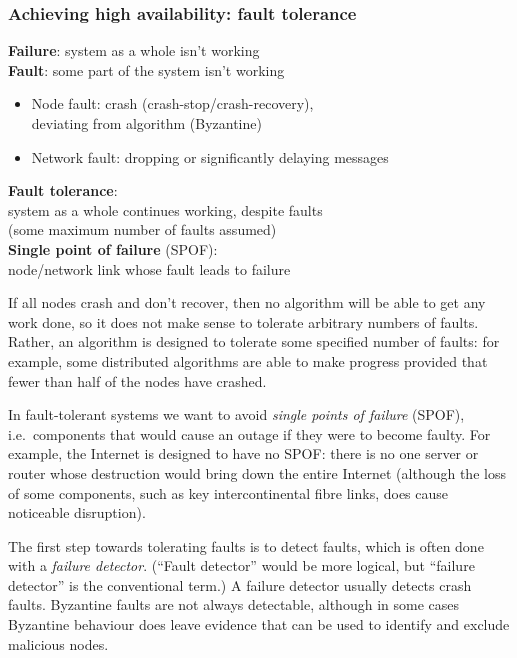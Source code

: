 \begin{frame}
    \label{s:fault-tolerance}
    \frametitle{Achieving high availability: fault tolerance}
    \textbf{Failure}: system as a whole isn't working\\[1em]
    \textbf{Fault}: some part of the system isn't working
    \begin{itemize}
        \item Node fault: crash (crash-stop/crash-recovery),\\deviating from algorithm (Byzantine)
        \item Network fault: dropping or significantly delaying messages\\[1em]
    \end{itemize}
    \textbf{Fault tolerance}:\\system as a whole continues working, despite faults\\
    (some maximum number of faults assumed)\\[1em]
    \textbf{Single point of failure} (SPOF):\\ node/network link whose fault leads to failure
\end{frame}
\label{l:fault-tolerance}

If all nodes crash and don't recover, then no algorithm will be able to get any work done, so it does not make sense to tolerate arbitrary numbers of faults.
Rather, an algorithm is designed to tolerate some specified number of faults: for example, some distributed algorithms are able to make progress provided that fewer than half of the nodes have crashed.

In fault-tolerant systems we want to avoid \emph{single points of failure} (SPOF), i.e.\ components that would cause an outage if they were to become faulty.
For example, the Internet is designed to have no SPOF: there is no one server or router whose destruction would bring down the entire Internet (although the loss of some components, such as key intercontinental fibre links, does cause noticeable disruption).

The first step towards tolerating faults is to detect faults, which is often done with a \emph{failure detector}.
(``Fault detector'' would be more logical, but ``failure detector'' is the conventional term.)
A failure detector usually detects crash faults.
Byzantine faults are not always detectable, although in some cases Byzantine behaviour does leave evidence that can be used to identify and exclude malicious nodes.

